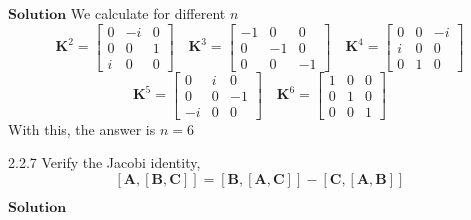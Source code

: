 \documentclass{styles/kaobook}
\begin{document}
$\boxed{\textbf{Solution}}$ We calculate for different $n$
$$\mathbf{K}^2 = \begin{bmatrix}{0} & {-i} & {0} \\ {0} & {0} & {1} \\ {i} & {0} & {0}\end{bmatrix} \quad \mathbf{K}^3=\begin{bmatrix}{-1} & {0} & {0} \\ {0} & {-1} & {0} \\ {0} & {0} & {-1}\end{bmatrix} \quad \mathbf{K}^4 = \begin{bmatrix}{0} & {0} & {-i} \\ {i} & {0} & {0} \\ {0} & {1} & {0}\end{bmatrix}$$
$$\mathbf{K}^5 = \begin{bmatrix}{0} & {i} & {0} \\ {0} & {0} & {-1} \\ {-i} & {0} & {0}\end{bmatrix} \quad \mathbf{K}^6 = \begin{bmatrix}{1} & {0} & {0} \\ {0} & {1} & {0} \\ {0} & {0} & {1}\end{bmatrix}$$
With this, the answer is $n=6$



\begin{greenbox}{2.2.7}
Verify the Jacobi identity,
$$[\mathbf{A},[\mathbf{B}, \mathbf{C}]]=[\mathbf{B},[\mathbf{A}, \mathbf{C}]]-[\mathbf{C},[\mathbf{A}, \mathbf{B}]]$$
\end{greenbox}

$\boxed{\textbf{Solution}}$ 
\end{document}

